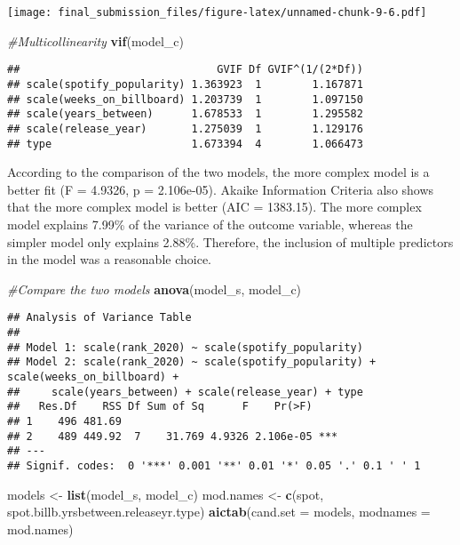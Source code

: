 \documentclass[
]{article}
\newenvironment{Shaded}{\begin{snugshade}}{\end{snugshade}}
\newcommand{\AttributeTok}[1]{\textcolor[rgb]{0.13,0.29,0.53}{#1}}
\newcommand{\CommentTok}[1]{\textcolor[rgb]{0.56,0.35,0.01}{\textit{#1}}}
\newcommand{\FunctionTok}[1]{\textcolor[rgb]{0.13,0.29,0.53}{\textbf{#1}}}
\newcommand{\NormalTok}[1]{#1}
\newcommand{\OtherTok}[1]{\textcolor[rgb]{0.56,0.35,0.01}{#1}}
\newcommand{\StringTok}[1]{\textcolor[rgb]{0.31,0.60,0.02}{#1}}
\begin{document}
\texttt{[image: final\_submission\_files/figure-latex/unnamed-chunk-9-6.pdf]}

\begin{Shaded}
\begin{Highlighting}[]
\CommentTok{\#Multicollinearity}
\FunctionTok{vif}\NormalTok{(model\_c)}
\end{Highlighting}
\end{Shaded}

\begin{verbatim}
##                               GVIF Df GVIF^(1/(2*Df))
## scale(spotify_popularity) 1.363923  1        1.167871
## scale(weeks_on_billboard) 1.203739  1        1.097150
## scale(years_between)      1.678533  1        1.295582
## scale(release_year)       1.275039  1        1.129176
## type                      1.673394  4        1.066473
\end{verbatim}

According to the comparison of the two models, the more complex model is
a better fit (F = 4.9326, p = 2.106e-05). Akaike Information Criteria
also shows that the more complex model is better (AIC = 1383.15). The
more complex model explains 7.99\% of the variance of the outcome
variable, whereas the simpler model only explains 2.88\%. Therefore, the
inclusion of multiple predictors in the model was a reasonable choice.

\begin{Shaded}
\begin{Highlighting}[]
\CommentTok{\#Compare the two models}
\FunctionTok{anova}\NormalTok{(model\_s, model\_c)}
\end{Highlighting}
\end{Shaded}

\begin{verbatim}
## Analysis of Variance Table
## 
## Model 1: scale(rank_2020) ~ scale(spotify_popularity)
## Model 2: scale(rank_2020) ~ scale(spotify_popularity) + scale(weeks_on_billboard) + 
##     scale(years_between) + scale(release_year) + type
##   Res.Df    RSS Df Sum of Sq      F    Pr(>F)    
## 1    496 481.69                                  
## 2    489 449.92  7    31.769 4.9326 2.106e-05 ***
## ---
## Signif. codes:  0 '***' 0.001 '**' 0.01 '*' 0.05 '.' 0.1 ' ' 1
\end{verbatim}

\begin{Shaded}
\begin{Highlighting}[]
\NormalTok{models }\OtherTok{\textless{}{-}} \FunctionTok{list}\NormalTok{(model\_s, model\_c)}
\NormalTok{mod.names }\OtherTok{\textless{}{-}} \FunctionTok{c}\NormalTok{(}\StringTok{\textquotesingle{}spot\textquotesingle{}}\NormalTok{, }\StringTok{\textquotesingle{}spot.billb.yrsbetween.releaseyr.type\textquotesingle{}}\NormalTok{)}
\FunctionTok{aictab}\NormalTok{(}\AttributeTok{cand.set =}\NormalTok{ models, }\AttributeTok{modnames =}\NormalTok{ mod.names)}
\end{Highlighting}
\end{Shaded}
\end{document}
